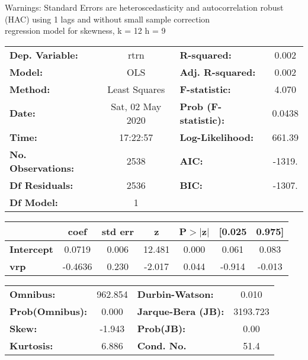 Warnings: \newline
 [1] Standard Errors are heteroscedasticity and autocorrelation robust (HAC) using 1 lags and without small sample correction\\ 

regression model for skewness, k = 12 h = 9\begin{center}
\begin{tabular}{lclc}
\toprule
\textbf{Dep. Variable:}    &       rtrn       & \textbf{  R-squared:         } &     0.002   \\
\textbf{Model:}            &       OLS        & \textbf{  Adj. R-squared:    } &     0.002   \\
\textbf{Method:}           &  Least Squares   & \textbf{  F-statistic:       } &     4.070   \\
\textbf{Date:}             & Sat, 02 May 2020 & \textbf{  Prob (F-statistic):} &   0.0438    \\
\textbf{Time:}             &     17:22:57     & \textbf{  Log-Likelihood:    } &    661.39   \\
\textbf{No. Observations:} &        2538      & \textbf{  AIC:               } &    -1319.   \\
\textbf{Df Residuals:}     &        2536      & \textbf{  BIC:               } &    -1307.   \\
\textbf{Df Model:}         &           1      & \textbf{                     } &             \\
\bottomrule
\end{tabular}
\begin{tabular}{lcccccc}
                   & \textbf{coef} & \textbf{std err} & \textbf{z} & \textbf{P$> |$z$|$} & \textbf{[0.025} & \textbf{0.975]}  \\
\midrule
\textbf{Intercept} &       0.0719  &        0.006     &    12.481  &         0.000        &        0.061    &        0.083     \\
\textbf{vrp}       &      -0.4636  &        0.230     &    -2.017  &         0.044        &       -0.914    &       -0.013     \\
\bottomrule
\end{tabular}
\begin{tabular}{lclc}
\textbf{Omnibus:}       & 962.854 & \textbf{  Durbin-Watson:     } &    0.010  \\
\textbf{Prob(Omnibus):} &   0.000 & \textbf{  Jarque-Bera (JB):  } & 3193.723  \\
\textbf{Skew:}          &  -1.943 & \textbf{  Prob(JB):          } &     0.00  \\
\textbf{Kurtosis:}      &   6.886 & \textbf{  Cond. No.          } &     51.4  \\
\bottomrule
\end{tabular}
\end{center}

